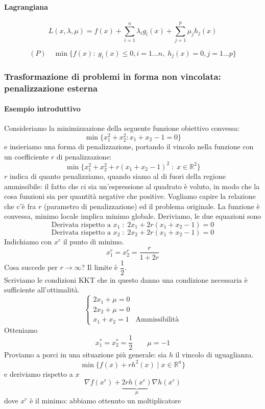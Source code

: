 \paragraph{Lagrangiana}
$$
L(x, \lambda, \mu) = f(x) +
\displaystyle \sum_{i=1}^{n}
\lambda_i g_i(x) +
\displaystyle \sum_{j=1}^{p}
\mu_j h_j(x)
$$

$$ (P) \quad  \min\{f(x): \; g_i(x)\leq 0, i=1\ldots n, \;
h_j(x)=0, j=1\ldots p \}
$$

\subsubsection{Trasformazione di problemi in forma non vincolata:
penalizzazione esterna}

\paragraph{Esempio introduttivo}
Consideriamo la minimizzazione della seguente funzione obiettivo convessa:
$$
\min \{ x_1^{2} + x_2^{2} : x_1 + x_2 -1 =0 \}
$$
e insieriamo una forma di penalizzazione, portando il vincolo
nella funzione con un coefficiente $r$ di penalizzazione:
$$
\min \{ x_1^{2} + x_2^{2} + r(x_1 + x_2 -1)^{2} \; : \;
x \in \mathbb{R}^{2}
\}
$$
$r$ indica di quanto penalizziamo, quando siamo al di fuori
della regione ammissibile: il fatto che ci sia un'espressione
al quadrato \`e voluto, in modo che la cosa funzioni sia
per quantit\`a negative che positive.
Vogliamo capire la relazione che c'\`e fra $r$ (parametro
di penalizzazione) ed il problema originale.
La funzione \`e convessa, minimo locale implica minimo
globale.
Deriviamo, le due equazioni sono
$$\text{Derivata rispetto a } x_1 \; :\;  2x_1 + 2r(x_1 + x_2 -1) = 0 $$
$$ \text{Derivata rispetto a }x_2\; : \; 2x_2 + 2r(x_1 + x_2 -1) = 0$$
Indichiamo con $x^{r}$ il punto di minimo.
$$ x_1^{r} = x_2^{r} = \dfrac{r}{1+2r}$$
Cosa succede per $r \to \infty$?
Il limite \`e $\dfrac{1}{2}$. \\
Scriviamo le condizioni KKT che in questo danno una condizione
necessaria \`e sufficiente all'ottimalit\`a.
$$
\left\{
\begin{array}{ll}
 2 x_1 + \mu = 0  & \\
 2 x_2 + \mu = 0  & \\
 x_1 + x_2 = 1 & \text{Ammissibilit\`a}
\end{array}
\right.
$$
Otteniamo
$$ x_1^{*} = x_2^{*} = \dfrac{1}{2}
\qquad \mu = -1
$$
Proviamo a porci in una situazione pi\`u generale: sia $h$ il
vincolo di uguaglianza.
$$
\min \{f(x) + rh^2(x) \; | \; x \in \mathbb{R}^{n} \}
$$
e deriviamo rispetto a $x$
$$\nabla f(x^{r}) + \underbrace{2rh(x^{r})}_{\mu} \nabla h(x^{r})
$$
dove $x^r$ \`e il minimo: abbiamo ottenuto un moltiplicatore

